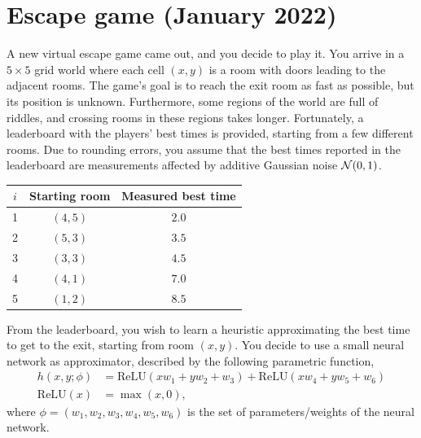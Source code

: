 \documentclass[11pt, a4paper]{article}
\begin{document}
\section{Escape game (January 2022)}

A new virtual escape game came out, and you decide to play it. You arrive in a $5 \times 5$ grid world where each cell $(x, y)$ is a room with doors leading to the adjacent rooms. The game's goal is to reach the exit room as fast as possible, but its position is unknown. Furthermore, some regions of the world are full of riddles, and crossing rooms in these regions takes longer. Fortunately, a leaderboard with the players' best times is provided, starting from a few different rooms. Due to rounding errors, you assume that the best times reported in the leaderboard are measurements affected by additive Gaussian noise $\mathcal{N}(0, 1)$.

\begin{table}[h]
    \centering
    \begin{tabular}{c|cc}
        \toprule
        $i$ & Starting room & Measured best time \\
        \midrule
        1 & $(4, 5)$ & $2.0$ \\
        2 & $(5, 3)$ & $3.5$ \\
        3 & $(3, 3)$ & $4.5$ \\
        4 & $(4, 1)$ & $7.0$ \\
        5 & $(1, 2)$ & $8.5$ \\
        \bottomrule
    \end{tabular}
\end{table}

From the leaderboard, you wish to learn a heuristic approximating the best time to get to the exit, starting from room $(x, y)$. You decide to use a small neural network as approximator, described by the following parametric function,
\begin{align*}
    h(x, y; \phi) & = \text{ReLU}(x w_1 + y w_2 + w_3) + \text{ReLU}(x w_4 + y w_5 + w_6) \\
    \text{ReLU}(x) & = \max(x, 0) ,
\end{align*}
where $\phi = (w_1, w_2, w_3, w_4, w_5, w_6)$ is the set of parameters/weights of the neural network.
\end{document}
